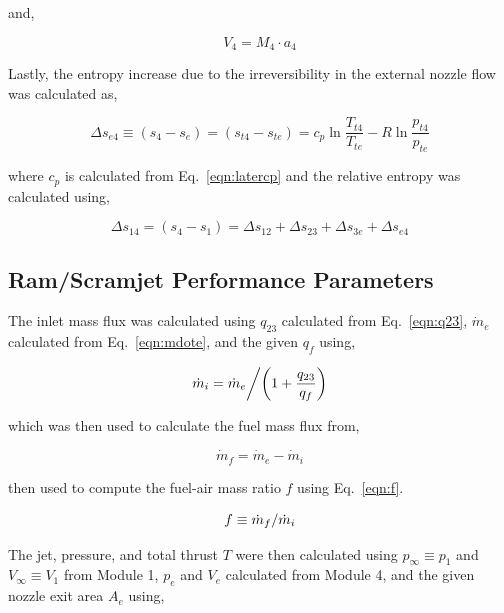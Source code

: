 \documentclass[conf]{new-aiaa} %
\begin{document}
and,

\begin{equation}
    \label{eqn:V4}
    V_4=M_4\cdot a_4
\end{equation}

Lastly, the entropy increase due to the irreversibility in the external nozzle flow was calculated as,

\begin{equation}
    \label{eqn:delse4}
    \Delta s_{e4}\equiv(s_4-s_e)=(s_{t4}-s_{te})=c_p \ln\frac{T_{t4}}{T_{te}}-R\ln\frac{p_{t4}}{p_{te}}
\end{equation}

where $c_p$ is calculated from Eq.~\eqref{eqn:latercp} and the relative entropy was calculated using,

\begin{equation}
    \label{eqn:dels14}
    \Delta s_{14}=(s_4-s_1)=\Delta s_{12}+\Delta s_{23}+\Delta s_{3e}+\Delta s_{e4}
\end{equation}

\subsection{Ram/Scramjet Performance Parameters}
The inlet mass flux was calculated using $q_{23}$ calculated from Eq.~\eqref{eqn:q23}, $\dot{m}_e$ calculated from Eq.~\eqref{eqn:mdote}, and the given $q_f$ using,

\begin{equation}
    \label{eqn:mdoti}
    \left. \dot{m}_i=\dot{m}_e \middle/ \left(1+\frac{q_{23}}{q_f}\right) \right.
\end{equation}

which was then used to calculate the fuel mass flux from,

\begin{equation}
    \label{eqn:mdotf}
    \dot{m}_f=\dot{m}_e-\dot{m}_i
\end{equation}

then used to compute the fuel-air mass ratio $f$ using Eq.~\eqref{eqn:f}.

\begin{equation}
    \label{eqn:f}
    \left. f\equiv\dot{m}_f\middle/\dot{m}_i \right.
\end{equation}

The jet, pressure, and total thrust $T$ were then calculated using $p_\infty\equiv p_1$ and $V_\infty\equiv V_1$ from Module 1, $p_e$ and $V_e$ calculated from Module 4, and the given nozzle exit area $A_e$ using,
\end{document}
